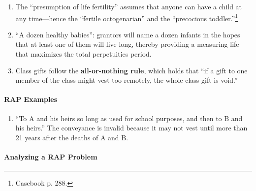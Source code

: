 \begin{enumerate}
\begin{enumerate}
        \item Valid: O transfers land ``in trust for A to life, then to A's 
        first child to reach 21.'' A is the validating life. The interest in 
        A's first child to reach 21 will necessarily vest prior to A's life 
        plus 21 years. Since you can prove that the interest must vest within 
        this period, the remainder is valid.\footnote{Casebook pp. 286--87.}
        \item Invalid: O transfers land ``in trust to A for life, then to A's 
        first child to reach 25.'' The interest will not necessarily vest 
        before after A's life plus 21 years. Thus, the remainder is invalid.
        \item Invalid: to A and his heirs so long as used for school purposes, 
        and then to B and his heirs. The interest will not necessarily vest or 
        terminate within A or B's lifetimes.
    \end{enumerate}
    \item The ``presumption of life fertility'' assumes that anyone can have a 
    child at any time---hence the ``fertile octogenarian'' and the 
    ``precocious toddler.''\footnote{Casebook p. 288.}
    \item ``A dozen healthy babies'': grantors will name a dozen infants in 
    the hopes that at least one of them will live long, thereby providing a 
    measuring life that maximizes the total perpetuities period.
    \item Class gifts follow the \textbf{all-or-nothing rule}, which holds 
    that ``if a gift to one member of the class might vest too remotely, the 
    whole class gift is void.'' %
\end{enumerate}

\paragraph{RAP Examples}

\begin{enumerate}
    \item ``To A and his heirs so long as used for school purposes, and then 
    to B and his heirs.'' The conveyance is invalid because it may not vest 
    until more than 21 years after the deaths of A and B.
\end{enumerate}

\paragraph{Analyzing a RAP Problem}

